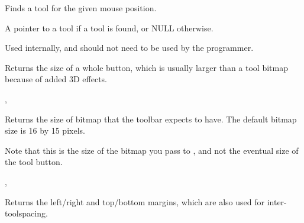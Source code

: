 Finds a tool for the given mouse position.





A pointer to a tool if a tool is found, or NULL otherwise.


Used internally, and should not need to be used by the programmer.

\label{wxtoolbargettoolsize}


Returns the size of a whole button, which is usually larger than a tool bitmap because
of added 3D effects.


,\rtfsp
{}

\label{wxtoolbargettoolbitmapsize}


Returns the size of bitmap that the toolbar expects to have. The default bitmap size is 16 by 15 pixels.


Note that this is the size of the bitmap you pass to ,
and not the eventual size of the tool button.


,\rtfsp
{}

\label{wxtoolbargetmargins}


Returns the left/right and top/bottom margins, which are also used for inter-toolspacing.



\label{wxtoolbargettoolclientdata}

